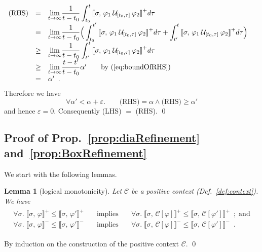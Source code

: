 \documentclass[envcountsect,orivec]{llncs} \usepackage{etex} \usepackage[]{graphicx}
\newtheorem{mylemma}[mytheorem]{Lemma}
\def\myqed{\qed}
\newcommand{\UntilOp}[1]{\mathbin{\mathcal{U}_{#1}}}
\newcommand{\Robust}[2]{{ \llbracket #1,\, #2 \rrbracket}}
\newcommand{\Lim}[1]{{\displaystyle{\lim_{#1}}}}
\newcommand{\Frac}[2]{{\displaystyle{\frac{#1}{#2}}}}
\newcommand{\Int}{\displaystyle \int}
\newcommand{\C}{\mathcal{C}}
\begin{document}
\begin{myproof}
  \[
    \begin{array}{rlll}
      \text{(RHS)} 
      & = & 
      \Lim{t \to \infty} \Frac{1}{t-t_0} \Int_{t_0}^{t} \Robust{\sigma}{\varphi_1 \UntilOp{[t_0, \tau]} \varphi_2}^{+} d\tau & \\
      & = & 
      \Lim{t \to \infty} \Frac{1}{t-t_0} \Big( 
      \Int_{t_0}^{t'} \Robust{\sigma}{\varphi_1 \UntilOp{[t_0, \tau]} \varphi_2}^{+} d\tau 
      + \Int_{t'}^{t} \Robust{\sigma}{\varphi_1 \UntilOp{[t_0, \tau]} \varphi_2}^{+} d\tau \Big)& \\
      & \geq & 
      \Lim{t \to \infty} \Frac{1}{t-t_0} 
      \Int_{t'}^{t} \Robust{\sigma}{\varphi_1 \UntilOp{[t_0, \tau]} \varphi_2}^{+} d\tau & \\
      & \geq & 
      \Lim{t \to \infty} \Frac{t-t'}{t-t_0} \alpha'  \qquad\text{by~(\ref{eq:boundOfRHS})}\\
      & = & \alpha'\enspace. & \\
    \end{array}
  \]
  Therefore we have
  \[
    \forall \alpha' < \alpha + \varepsilon. \qquad \text{(RHS)} = \alpha \wedge \text{(RHS)} \geq \alpha'    
  \]
  and hence $\varepsilon = 0$.
  Consequently
  (LHS) $=$ (RHS).
  \myqed
\end{myproof}

\subsection{Proof of Prop.~\ref{prop:diaRefinement} and~\ref{prop:BoxRefinement}}
 We start with the following lemmas.
\begin{mylemma}[logical monotonicity]
  \label{lem:monotonicity}
  Let $\C$ be a positive context (Def.~\ref{def:context}). We have
\begin{align*}
    \begin{array}{rcl}
      \forall \sigma.\; \Robust{\sigma}{\varphi}^{+} 
      \leq \Robust{\sigma}{\varphi'}^{+}
      \quad&\text{implies}
      &\quad 
        \forall \sigma.\; \Robust{\sigma}{\C[\varphi]}^{+} 
        \leq
        \Robust{\sigma}{\C[\varphi']}^{+}\enspace;\;\text{and}\\
      \forall \sigma.\; \Robust{\sigma}{\varphi}^{-} 
      \leq \Robust{\sigma}{\varphi'}^{-}
      \quad&\text{implies}
      &\quad 
        \forall \sigma.\; \Robust{\sigma}{\C[\varphi]}^{-} 
        \leq 
        \Robust{\sigma}{\C[\varphi']}^{-} \enspace.
    \end{array}  
  \end{align*}
\end{mylemma}
\begin{myproof}
  By induction on the construction of the positive context $\C$.
  \myqed
\end{myproof}
\end{document}
